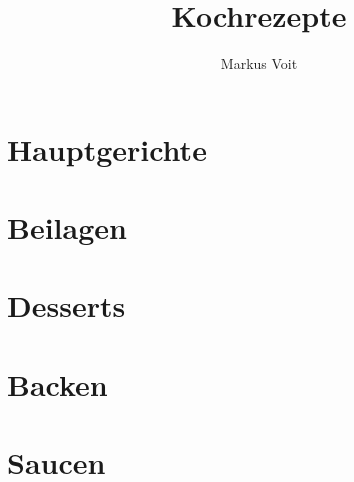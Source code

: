 \documentclass[DIV=11, pagesize, fontsize=11pt, paper=a4, numbers=noenddot]{scrartcl}
\title{Kochrezepte}
\author{Markus Voit}
\begin{document}
\maketitle

\tableofcontents
\clearpage

\section{Hauptgerichte}
\newpage{}
\newpage{}
\newpage{}
\newpage{}
\newpage{}
\newpage{}
\newpage{}
\newpage{}
\newpage{}

\section{Beilagen}
\newpage{}
\newpage{}
\newpage{}

\section{Desserts}
\newpage{}
\newpage{}
\newpage{}
\newpage{}
\newpage{}

\section{Backen}
\newpage{}
\newpage{}
\newpage{}

\section{Saucen}
\newpage{}
\newpage{}
\newpage{}
\newpage{}
\newpage{}
\newpage{}
\newpage{}
\newpage{}
\newpage{}
\end{document}
